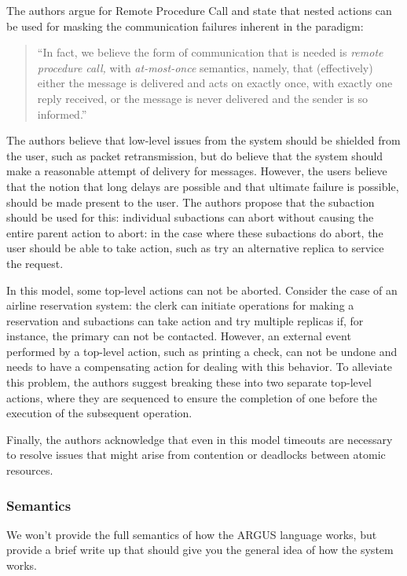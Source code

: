 The authors argue for Remote Procedure Call and state that nested actions can be used for masking the communication failures inherent in the paradigm:

\begin{quote}
``In fact, we believe the form of communication that is needed is \textit{remote procedure call,} with \textit{at-most-once} semantics, namely, that (effectively) either the message is delivered and acts on exactly once, with exactly one reply received, or the message is never delivered and the sender is so informed.''	
\end{quote}

The authors believe that low-level issues from the system should be shielded from the user, such as packet retransmission, but do believe that the system should make a reasonable attempt of delivery for messages.  However, the users believe that the notion that long delays are possible and that ultimate failure is possible, should be made present to the user.  The authors propose that the subaction should be used for this: individual subactions can abort without causing the entire parent action to abort: in the case where these subactions do abort, the user should be able to take action, such as try an alternative replica to service the request.  

In this model, some top-level actions can not be aborted.  Consider the case of an airline reservation system: the clerk can initiate operations for making a reservation and subactions can take action and try multiple replicas if, for instance, the primary can not be contacted.  However, an external event performed by a top-level action, such as printing a check, can not be undone and needs to have a compensating action for dealing with this behavior.  To alleviate this problem, the authors suggest breaking these into two separate top-level actions, where they are sequenced to ensure the completion of one before the execution of the subsequent operation.

Finally, the authors acknowledge that even in this model timeouts are necessary to resolve issues that might arise from contention or deadlocks between atomic resources.  

\subsubsection{Semantics}

We won't provide the full semantics of how the ARGUS language works, but provide a brief write up that should give you the general idea of how the system works.

